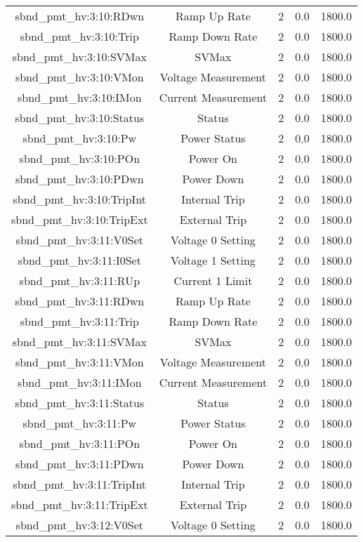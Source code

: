\begin{center}
\begin{longtable}{c | c c c c }
sbnd\_pmt\_hv:3:10:RDwn & Ramp Up Rate & 2 & 0.0 & 1800.0\\ 
sbnd\_pmt\_hv:3:10:Trip & Ramp Down Rate & 2 & 0.0 & 1800.0\\ 
sbnd\_pmt\_hv:3:10:SVMax & SVMax & 2 & 0.0 & 1800.0\\ 
sbnd\_pmt\_hv:3:10:VMon & Voltage Measurement & 2 & 0.0 & 1800.0\\ 
sbnd\_pmt\_hv:3:10:IMon & Current Measurement & 2 & 0.0 & 1800.0\\ 
sbnd\_pmt\_hv:3:10:Status & Status & 2 & 0.0 & 1800.0\\ 
sbnd\_pmt\_hv:3:10:Pw & Power Status & 2 & 0.0 & 1800.0\\ 
sbnd\_pmt\_hv:3:10:POn & Power On & 2 & 0.0 & 1800.0\\ 
sbnd\_pmt\_hv:3:10:PDwn & Power Down & 2 & 0.0 & 1800.0\\ 
sbnd\_pmt\_hv:3:10:TripInt & Internal Trip & 2 & 0.0 & 1800.0\\ 
sbnd\_pmt\_hv:3:10:TripExt & External Trip & 2 & 0.0 & 1800.0\\ 
sbnd\_pmt\_hv:3:11:V0Set & Voltage 0 Setting & 2 & 0.0 & 1800.0\\ 
sbnd\_pmt\_hv:3:11:I0Set & Voltage 1 Setting & 2 & 0.0 & 1800.0\\ 
sbnd\_pmt\_hv:3:11:RUp & Current 1 Limit & 2 & 0.0 & 1800.0\\ 
sbnd\_pmt\_hv:3:11:RDwn & Ramp Up Rate & 2 & 0.0 & 1800.0\\ 
sbnd\_pmt\_hv:3:11:Trip & Ramp Down Rate & 2 & 0.0 & 1800.0\\ 
sbnd\_pmt\_hv:3:11:SVMax & SVMax & 2 & 0.0 & 1800.0\\ 
sbnd\_pmt\_hv:3:11:VMon & Voltage Measurement & 2 & 0.0 & 1800.0\\ 
sbnd\_pmt\_hv:3:11:IMon & Current Measurement & 2 & 0.0 & 1800.0\\ 
sbnd\_pmt\_hv:3:11:Status & Status & 2 & 0.0 & 1800.0\\ 
sbnd\_pmt\_hv:3:11:Pw & Power Status & 2 & 0.0 & 1800.0\\ 
sbnd\_pmt\_hv:3:11:POn & Power On & 2 & 0.0 & 1800.0\\ 
sbnd\_pmt\_hv:3:11:PDwn & Power Down & 2 & 0.0 & 1800.0\\ 
sbnd\_pmt\_hv:3:11:TripInt & Internal Trip & 2 & 0.0 & 1800.0\\ 
sbnd\_pmt\_hv:3:11:TripExt & External Trip & 2 & 0.0 & 1800.0\\ 
sbnd\_pmt\_hv:3:12:V0Set & Voltage 0 Setting & 2 & 0.0 & 1800.0\\ 

\end{longtable}
\end{center}
